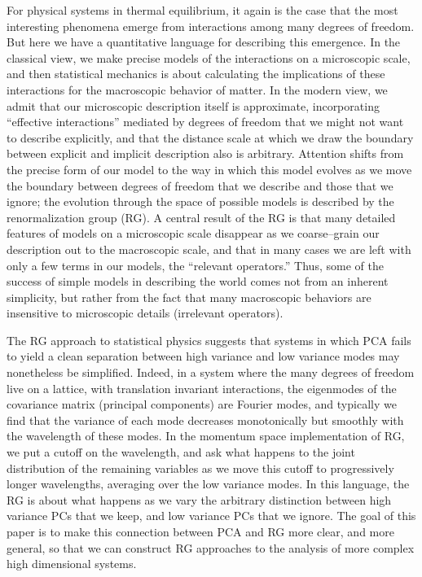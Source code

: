 \documentclass[aps,twocolumn,floats,nofootinbib,prl]{revtex4}
\begin{document}
For physical systems in thermal equilibrium, it again is the case that the most interesting phenomena emerge from interactions among many degrees of freedom.  But here we have a quantitative language for describing this emergence.  In the classical view, we make precise models of the interactions on a microscopic scale, and then statistical mechanics is about calculating the implications of these interactions for the macroscopic behavior of matter.   In the modern view, we admit that our microscopic description itself is approximate, incorporating ``effective interactions'' mediated by degrees of freedom that we might not want to describe explicitly, and that the distance scale at which we draw the boundary between explicit and implicit description also is arbitrary.  Attention shifts from the precise form of our model to the way in which this model evolves as we move the boundary between degrees of freedom that we describe and those that we ignore; the evolution through the space of possible models is described by the renormalization group (RG).  A central result of the RG is that many detailed features of models on a microscopic scale disappear as we coarse--grain our description out to the macroscopic scale, and that in many cases we are left with only a few terms in our models, the ``relevant operators.''  Thus, some of the success of simple models in describing the world comes not from an inherent simplicity, but rather from the fact that many macroscopic behaviors are insensitive to microscopic details (irrelevant operators).  

The RG approach to statistical physics suggests that systems in which PCA fails to yield a clean separation between high variance and low variance modes may nonetheless be simplified.  Indeed, in a system where the many degrees of freedom live on a lattice, with translation invariant interactions, the eigenmodes of the covariance matrix (principal components) are Fourier modes, and typically we find that the variance of each mode decreases monotonically but smoothly with the wavelength of these modes.  In the momentum space implementation of RG, we put a cutoff on the wavelength, and ask what happens to the joint distribution of the remaining variables as we move this cutoff to progressively longer wavelengths, averaging over the low variance modes.  In this language, the RG is about what happens as we vary the arbitrary distinction between high variance PCs that we keep, and low variance PCs that we ignore.    The goal of this paper is to make this connection between PCA and RG more clear, and more general, so that we can construct RG approaches to the analysis of more complex high dimensional systems.
\end{document}

